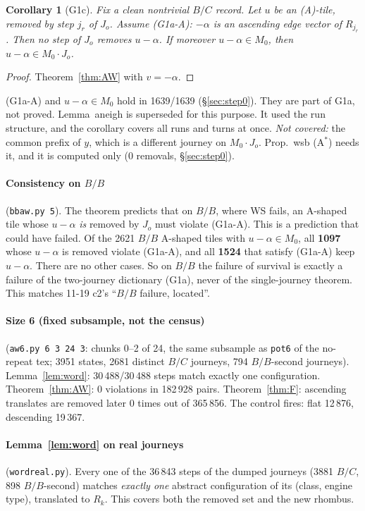 \documentclass[11pt]{article}
\newtheorem{corollary}[theorem]{Corollary}
\theoremstyle{definition}\newtheorem{definition}[theorem]{Definition}\newtheorem{remark}[theorem]{Remark}
\begin{document}
\begin{corollary}[G1c]\label{cor:G1c}
Fix a clean nontrivial $B/C$ record. Let $u$ be an (A)-tile, removed by step $j_r$ of $J_o$. Assume \textup{(G1a-A)}: $-\alpha$ is an ascending edge vector of $R_{j_r}$. Then no step of $J_o$ removes $u-\alpha$. If moreover $u-\alpha\in M_0$, then $u-\alpha\in M_0\cdot J_o$.
\end{corollary}
\begin{proof}
Theorem~\ref{thm:AW} with $v=-\alpha$.
\end{proof}
\noindent(G1a-A) and $u-\alpha\in M_0$ hold in 1639/1639 (\S\ref{sec:step0}). They are part of G1a, not proved. Lemma~aneigh is superseded for this purpose. It used the run structure, and the corollary covers all runs and turns at once.
\emph{Not covered:} the common prefix of $y$, which is a different journey on $M_0\cdot J_o$. Prop.~wsb (A$^*$) needs it, and it is computed only (0 removals, \S\ref{sec:step0}).

\paragraph{Consistency on $B/B$}\label{sec:bbaw} (\texttt{bbaw.py 5}). The theorem predicts that on $B/B$, where WS fails, an A-shaped tile whose $u-\alpha$ \emph{is} removed by $J_o$ must violate (G1a-A). This is a prediction that could have failed.
Of the 2621 $B/B$ A-shaped tiles with $u-\alpha\in M_0$, all \textbf{1097} whose $u-\alpha$ is removed violate (G1a-A), and all \textbf{1524} that satisfy (G1a-A) keep $u-\alpha$. There are no other cases.
So on $B/B$ the failure of survival is exactly a failure of the two-journey dictionary (G1a), never of the single-journey theorem. This matches 11-19 c2's ``$B/B$ failure, located''.

\paragraph{Size 6 (fixed subsample, not the census)} (\texttt{aw6.py 6 3 24 3}: chunks 0--2 of 24, the same subsample as \texttt{pot6} of the no-repeat tex; 3951 states, 2681 distinct $B/C$ journeys, 794 $B/B$-second journeys).
Lemma~\ref{lem:word}: 30\,488/30\,488 steps match exactly one configuration. Theorem~\ref{thm:AW}: 0 violations in 182\,928 pairs. Theorem~\ref{thm:F}: ascending translates are removed later 0 times out of 365\,856. The control fires: flat 12\,876, descending 19\,367.

\paragraph{Lemma~\ref{lem:word} on real journeys} (\texttt{wordreal.py}). Every one of the 36\,843 steps of the dumped journeys (3881 $B/C$, 898 $B/B$-second) matches \emph{exactly one} abstract configuration of its (class, engine type), translated to $R_k$. This covers both the removed set and the new rhombus.
\end{document}
